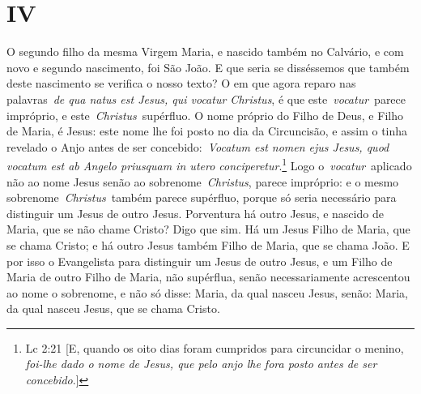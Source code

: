 \section*{IV}

O segundo filho da mesma Virgem Maria, e nascido também no
Calvário, e com novo e segundo nascimento, foi São João. E que seria se
disséssemos que também deste nascimento se verifica o nosso texto? O em
que agora reparo nas palavras~\emph{de qua natus est Jesus, qui vocatur
Christus}, é que este~\emph{vocatur}~parece impróprio, e
este~\emph{Christus}~supérfluo. O nome próprio do Filho de Deus, e Filho
de Maria, é Jesus: este nome lhe foi posto no dia da Circuncisão, e
assim o tinha revelado o Anjo antes de ser concebido:~\emph{Vocatum est
nomen ejus Jesus, quod vocatum est ab Angelo priusquam in utero
conciperetur}.\footnote{Lc 2:21 [E, quando os oito dias foram cumpridos para circuncidar o menino, \textit{foi-lhe dado o nome de Jesus, que pelo anjo lhe fora posto antes de ser concebido}.]} Logo o~\emph{vocatur}~aplicado não ao
nome Jesus senão ao sobrenome~\emph{Christus}, parece impróprio: e o
mesmo sobrenome~\emph{Christus}~também parece supérfluo, porque só seria
necessário para distinguir um Jesus de outro Jesus. Porventura há outro
Jesus, e nascido de Maria, que se não chame Cristo? Digo que sim. Há um
Jesus Filho de Maria, que se chama Cristo; e há outro Jesus também Filho
de Maria, que se chama João. E por isso o Evangelista para distinguir um
Jesus de outro Jesus, e um Filho de Maria de outro Filho de Maria, não
supérflua, senão necessariamente acrescentou ao nome o sobrenome, e não
só disse: Maria, da qual nasceu Jesus, senão: Maria, da qual nasceu
Jesus, que se chama Cristo.


